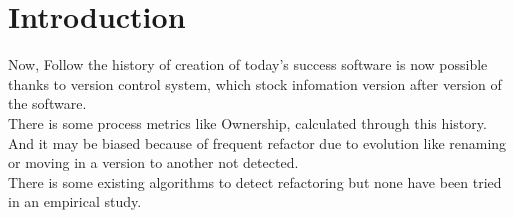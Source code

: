 \section{Introduction}
\label{sec:intro}
Now, Follow the history of creation of today’s success software is now possible thanks to version control system, which stock infomation version after version of the software.\\

There is some process metrics like Ownership, calculated through this history. And it may be biased because of frequent refactor due to evolution like renaming or moving in a version to another not detected.\\

There is some existing algorithms to detect refactoring but none have been tried in an empirical study.\\

